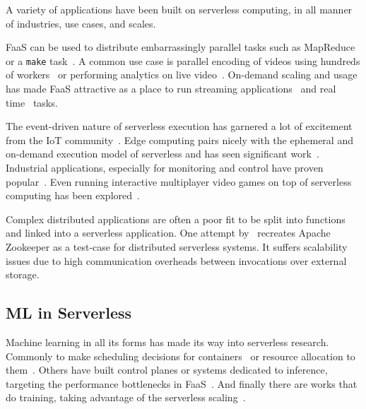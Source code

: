 A variety of applications have been built on serverless computing, in all manner of industries, use cases, and scales.

FaaS can be used to distribute embarrassingly parallel tasks such as MapReduce~\cite{jonas2017occupy} or a \texttt{make} task~\cite{fouladi2019laptop}.
A common use case is parallel encoding of videos using hundreds of workers~\cite{ao2018sprocket, zhang2019video} or performing analytics on live video~\cite{romero2021llama, risco2021gpu}.
On-demand scaling and usage has made FaaS attractive as a place to run streaming applications~\cite{konstantoudakis2022serverless,wang2021wearmask,elordi2021demand} and real time~\cite{yan2016building,anand2019low} tasks.

The event-driven nature of serverless execution has garnered a lot of excitement from the IoT community~\cite{benedetti2021experimental,trilles2020iot,hu2020hivemind,persson2017kappa}.
Edge computing pairs nicely with the ephemeral and on-demand execution model of serverless and has seen significant work~\cite{cicconetti2020decentralized,cheng2019fog,wang2020supporting}.
Industrial applications, especially for monitoring and control have proven popular~\cite{hussain2019serverless,mete2021implementation,zhang2021serverless}.
Even running interactive multiplayer video games on top of serverless computing has been explored~\cite{donkervlietservo}.

Complex distributed applications are often a poor fit to be split into functions and linked into a serverless application.
One attempt by~\cite{copik2022faaskeeper} recreates Apache Zookeeper as a test-case for distributed serverless systems. 
It suffers scalability issues due to high communication overheads between invocations over external storage.

\subsection{ML in Serverless}
\label{sec:serverless-ai}

Machine learning in all its forms has made its way into serverless research.
Commonly to make scheduling decisions for containers~\cite{balaji2021fireplace} or resource allocation to them~\cite{mvondo2021ofc,eismann2021sizeless}.
Others have built control planes or systems dedicated to inference, targeting the performance bottlenecks in FaaS~\cite{yang2022infless, ali2022optimizing}.
And finally there are works that do training, taking advantage of the serverless scaling~\cite{wang2019distributed, gimeno2022mlless, xu2021lambdadnn}.

